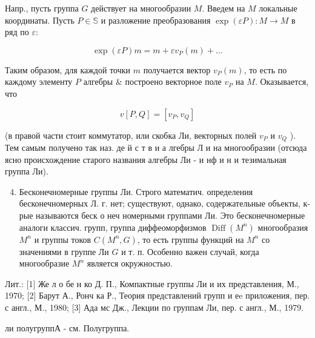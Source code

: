 \documentclass[10pt]{article}
\begin{document}
Напр., пусть группа $G$ действует на многообразии $M$. Введем на $M$ локальные координаты. Пусть $P \in \mathbb{S}$ и разложение преобразования $\exp (\varepsilon P): M \rightarrow M$ в ряд по $\varepsilon:$



\[

\exp (\varepsilon P) m=m+\varepsilon v_{P}(m)+\ldots

\]



Таким образом, для каждой точки $m$ получается вектор $v_{P}(m)$, то есть по каждому элементу $P$ алгебры \& построено векторное поле $v_{P}$ на $M$. Оказывается, что



\[

v[P, Q]=\left[v_{P}, v_{Q}\right]

\]



(в правой части стоит коммутатор, или скобка Ли, векторных полей $v_{P}$ и $v_{Q}$ ). Тем самым получено так наз. де й с т в и а лгебры Л и на многообразии (отсюда ясно происхождение старого названия алгебры Ли - и нф и н и тезимальная группа Ли).



\begin{enumerate}

  \setcounter{enumi}{3}

  \item Бесконечномерные группы Ли. Строго математич. определения бесконечномерных Л. г. нет; существуют, однако, содержательные объекты, к-рые называются беск о неч номерными группами Ли. Это бесконечномерные аналоги классич. групп, группа диффеоморфизмов $\operatorname{Diff}\left(M^{n}\right)$ многообразия $M^{n}$ и группы токов $C\left(M^{n}, G\right)$, то есть группы функций на $M^{n}$ со значениями в группе Ли $G$ и т. п. Особенно важен случай, когда многообразие $M^{n}$ является окружностью.

\end{enumerate}



Лит.: [1] Же л о бе н ко Д. П., Компактные группы Ли и их представления, М., 1970; [2] Барут А., Ронч ка Р., Теория представлений групп и еe приложения, пер. с англ., М., 1980; [3] Ада мс Дж., Лекции по группам Ли, пер. с англ., М., 1979.



ли полугруппА - см. Полугруппа.
\end{document}
